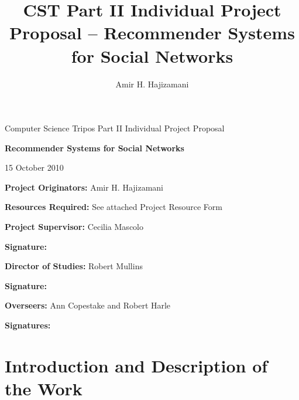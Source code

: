 
\author{Amir H. Hajizamani}
\title{CST Part II Individual Project Proposal -- Recommender Systems for Social Networks}


\newcommand{\al}{$<$}
\newcommand{\ar}{$>$}

\parindent 0pt
\parskip 6pt

\thispagestyle{empty}

\medskip
{}
\medskip
{}

\vfill

\centerline{\large Computer Science Tripos Part II Individual Project Proposal}
\vspace{0.4in}
\centerline{\Large\bf Recommender Systems for Social Networks}
\vspace{0.3in}
\centerline{\large{15 October 2010}}

\vfill

{\bf Project Originators:} Amir H. Hajizamani

\vspace{0.1in}

{\bf Resources Required:} See attached Project Resource Form

\vspace{0.5in}

{\bf Project Supervisor:} Cecilia Mascolo

\vspace{0.2in}

{\bf Signature:}

\vspace{0.5in}

{\bf Director of Studies:} Robert Mullins

\vspace{0.2in}

{\bf Signature:}

\vspace{0.5in}

{\bf Overseers:} Ann Copestake and Robert Harle

\vspace{0.2in}

{\bf Signatures:}

\vfill
\eject


\section{Introduction and Description of the Work}

